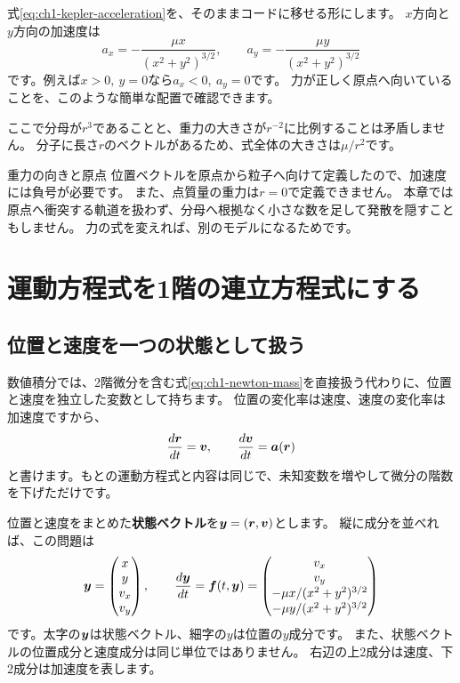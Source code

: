式\eqref{eq:ch1-kepler-acceleration}を、そのままコードに移せる形にします。
$x$方向と$y$方向の加速度は
\begin{equation}
a_x=-\frac{\mu x}{(x^2+y^2)^{3/2}},\qquad
a_y=-\frac{\mu y}{(x^2+y^2)^{3/2}}
\label{eq:ch1-acceleration-components}
\end{equation}
です。例えば$x>0,\ y=0$なら$a_x<0,\ a_y=0$です。
力が正しく原点へ向いていることを、このような簡単な配置で確認できます。

ここで分母が$r^3$であることと、重力の大きさが$r^{-2}$に比例することは矛盾しません。
分子に長さ$r$のベクトルがあるため、式全体の大きさは$\mu/r^2$です。

\begin{failbox}{重力の向きと原点}
位置ベクトルを原点から粒子へ向けて定義したので、加速度には負号が必要です。
また、点質量の重力は$r=0$で定義できません。
本章では原点へ衝突する軌道を扱わず、分母へ根拠なく小さな数を足して発散を隠すこともしません。
力の式を変えれば、別のモデルになるためです。
\end{failbox}

\section{運動方程式を1階の連立方程式にする}
\label{sec:ch1-first-order}

\subsection{位置と速度を一つの状態として扱う}

数値積分では、2階微分を含む式\eqref{eq:ch1-newton-mass}を直接扱う代わりに、位置と速度を独立した変数として持ちます。
位置の変化率は速度、速度の変化率は加速度ですから、
\begin{equation}
\frac{d\boldsymbol r}{dt}=\boldsymbol v,\qquad \frac{d\boldsymbol v}{dt}=\boldsymbol a(\boldsymbol r)
\label{eq:ch1-first-order}
\end{equation}
と書けます。もとの運動方程式と内容は同じで、未知変数を増やして微分の階数を下げただけです。

位置と速度をまとめた\textbf{状態ベクトル}を$\boldsymbol y=(\boldsymbol r,\boldsymbol v)$とします。
縦に成分を並べれば、この問題は
\begin{equation}
\boldsymbol y=
\begin{pmatrix}x\\y\\v_x\\v_y\end{pmatrix},\qquad
\frac{d\boldsymbol y}{dt}=\boldsymbol f(t,\boldsymbol y)=
\begin{pmatrix}
v_x\\ v_y\\ -\mu x/(x^2+y^2)^{3/2}\\ -\mu y/(x^2+y^2)^{3/2}
\end{pmatrix}
\label{eq:ch1-state-ode}
\end{equation}
です。太字の$\boldsymbol y$は状態ベクトル、細字の$y$は位置の$y$成分です。
また、状態ベクトルの位置成分と速度成分は同じ単位ではありません。
右辺の上2成分は速度、下2成分は加速度を表します。

